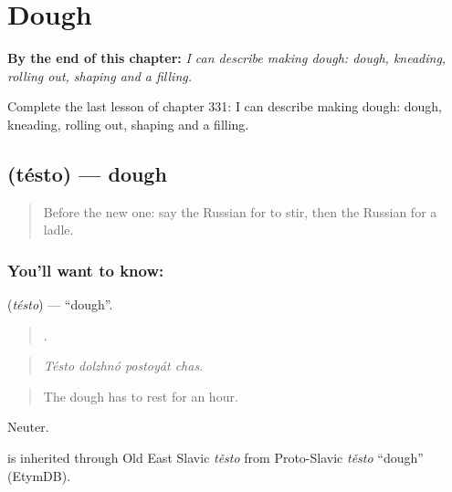 
\chapter{Dough}
\label{ch:ru-dough}

\begin{chapteropening}
\textbf{By the end of this chapter:} \emph{I can describe making dough: dough, kneading, rolling out, shaping and a filling.}

Complete the last lesson of chapter 331: I can describe making dough: dough, kneading, rolling out, shaping and a filling.
\end{chapteropening}

\section[\texorpdfstring{\ru{тесто} (tésto)}{тесто (tésto)}]{ (tésto) — dough}

\label{lesson:RU-C331-testo}



\begin{quote}
Before the new one: say the Russian for to stir, then the Russian for a ladle.
\end{quote}

\subsection*{You'll want to know: }
\textbf{} (\emph{tésto}) — \textquotedblleft{}dough\textquotedblright{}.

\begin{quote}
   .
\end{quote}

\begin{quote}
\emph{Tésto dolzhnó postoyát chas.}
\end{quote}

\begin{quote}
The dough has to rest for an hour.
\end{quote}

Neuter.

\begin{cousinweb}
\emph{} is inherited through Old East Slavic \emph{těsto} from Proto-Slavic \emph{těsto} \textquotedblleft{}dough\textquotedblright{} (EtymDB).
\end{cousinweb}

